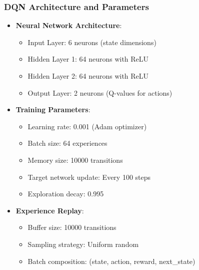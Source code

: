 \documentclass[a4paper, 12pt]{article}
\begin{document}
\subsubsection{DQN Architecture and Parameters}
\begin{tcolorbox}[title=DQN Configuration]
\begin{itemize}
    \item \textbf{Neural Network Architecture}:
    \begin{itemize}
        \item Input Layer: 6 neurons (state dimensions)
        \item Hidden Layer 1: 64 neurons with ReLU
        \item Hidden Layer 2: 64 neurons with ReLU
        \item Output Layer: 2 neurons (Q-values for actions)
    \end{itemize}
    \item \textbf{Training Parameters}:
    \begin{itemize}
        \item Learning rate: 0.001 (Adam optimizer)
        \item Batch size: 64 experiences
        \item Memory size: 10000 transitions
        \item Target network update: Every 100 steps
        \item Exploration decay: 0.995
    \end{itemize}
    \item \textbf{Experience Replay}:
    \begin{itemize}
        \item Buffer size: 10000 transitions
        \item Sampling strategy: Uniform random
        \item Batch composition: (state, action, reward, next_state)
    \end{itemize}
\end{itemize}
\end{tcolorbox}
\end{document}
